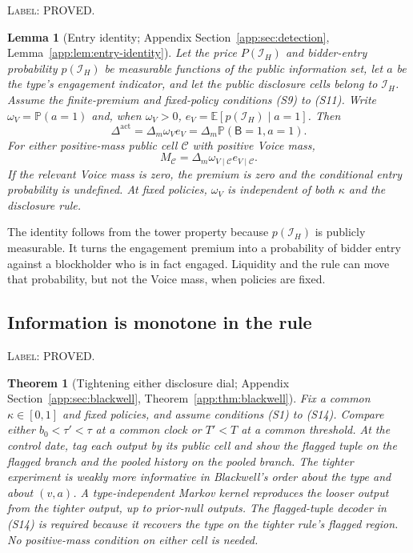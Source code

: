 \documentclass[11pt]{article}
\newtheorem{theorem}{Theorem}
\newtheorem{lemma}{Lemma}
\newcommand{\Eop}{\mathbb{E}}
\newcommand{\Prb}{\mathbb{P}}
\newcommand{\Dact}{\Delta^{\mathrm{act}}}
\begin{document}
\noindent\textsc{Label: PROVED.}\par
\begin{lemma}[Entry identity; Appendix Section~\ref{app:sec:detection}, Lemma~\ref{app:lem:entry-identity}]
\label{lem:entry-identity}
Let the price $P(\mathcal I_H)$ and bidder-entry probability $p(\mathcal I_H)$ be measurable
functions of the public information set, let $a$ be the type's engagement indicator, and let the
public disclosure cells belong to $\mathcal I_H$. Assume the finite-premium and fixed-policy
conditions (S9) to (S11). Write $\omega_V=\Prb(a=1)$ and, when $\omega_V>0$,
$e_V=\Eop[p(\mathcal I_H)\mid a=1]$. Then
\begin{equation}
\label{eq:entry-identity-main}
\Dact=\Delta_m\omega_Ve_V=\Delta_m\Prb(\mathsf B=1,a=1).
\end{equation}
For either positive-mass public cell $\mathcal C$ with positive Voice mass,
\begin{equation}
\label{eq:entry-identity-cell-main}
M_{\mathcal C}=\Delta_m\omega_{V\mid\mathcal C}e_{V\mid\mathcal C}.
\end{equation}
If the relevant Voice mass is zero, the premium is zero and the conditional entry probability is
undefined. At fixed policies, $\omega_V$ is independent of both $\kappa$ and the disclosure rule.
\end{lemma}

The identity follows from the tower property because $p(\mathcal I_H)$ is publicly measurable. It
turns the engagement premium into a probability of bidder entry against a blockholder who is in
fact engaged. Liquidity and the rule can move that probability, but not the Voice mass, when
policies are fixed.

\subsection{Information is monotone in the rule}
\label{sec:blackwell}

\noindent\textsc{Label: PROVED.}\par
\begin{theorem}[Tightening either disclosure dial; Appendix Section~\ref{app:sec:blackwell}, Theorem~\ref{app:thm:blackwell}]
\label{thm:blackwell}
Fix a common $\kappa\in[0,1]$ and fixed policies, and assume conditions (S1) to (S14). Compare either
$b_0<\tau'<\tau$ at a common clock or $T'<T$ at a common threshold. At the control date, tag each
output by its public cell and show the flagged tuple on the flagged branch and the pooled history on
the pooled branch. The tighter experiment is weakly more informative in Blackwell's order about the
type and about $(v,a)$. A type-independent Markov kernel reproduces the looser output from the
tighter output, up to prior-null outputs. The flagged-tuple decoder in (S14) is required because it
recovers the type on the tighter rule's flagged region. No positive-mass condition on either cell
is needed.
\end{theorem}
\end{document}
